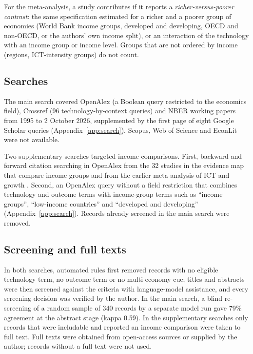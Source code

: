 \documentclass[11pt,a4paper]{article}
\begin{document}
For the meta-analysis, a study contributes if it reports a \emph{richer-versus-poorer contrast}: the same specification estimated for a richer and a poorer group of economies (World Bank income groups, developed and developing, OECD and non-OECD, or the authors' own income split), or an interaction of the technology with an income group or income level. Groups that are not ordered by income (regions, ICT-intensity groups) do not count.

\subsection{Searches}
The main search covered OpenAlex (a Boolean query restricted to the economics field), Crossref (96 technology-by-context queries) and NBER working papers from 1995 to 2 October 2026, supplemented by the first page of eight Google Scholar queries (Appendix~\ref{app:search}). Scopus, Web of Science and EconLit were not available.

Two supplementary searches targeted income comparisons. First, backward and forward citation searching \cite{wohlin2014} in OpenAlex from the 32 studies in the evidence map that compare income groups and from the earlier meta-analysis of ICT and growth \cite{stanley2018}. Second, an OpenAlex query without a field restriction that combines technology and outcome terms with income-group terms such as ``income groups'', ``low-income countries'' and ``developed and developing'' (Appendix~\ref{app:search}). Records already screened in the main search were removed.

\subsection{Screening and full texts}
In both searches, automated rules first removed records with no eligible technology term, no outcome term or no multi-economy cue; titles and abstracts were then screened against the criteria with language-model assistance, and every screening decision was verified by the author. In the main search, a blind re-screening of a random sample of 340 records by a separate model run gave 79\% agreement at the abstract stage (kappa 0.59). In the supplementary searches only records that were includable and reported an income comparison were taken to full text. Full texts were obtained from open-access sources or supplied by the author; records without a full text were not used.
\end{document}
